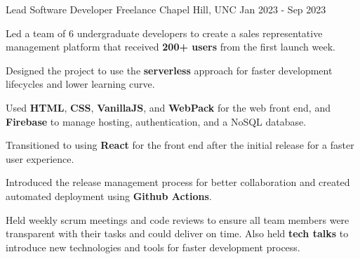 
\begin{cventries}
  \cventry
    {Lead Software Developer} %
    {Freelance} %
    {Chapel Hill, UNC} %
    {Jan 2023 - Sep 2023} %
    {
      \begin{cvitems} %
        \item {Led a team of 6 undergraduate developers to create a sales representative management platform that received \textbf{200+ users} from the first launch week.}
        \item {Designed the project to use the \textbf{serverless} approach for faster development lifecycles and lower learning curve.}
        \item {Used \textbf{HTML}, \textbf{CSS}, \textbf{VanillaJS}, and \textbf{WebPack} for the web front end, and \textbf{Firebase} to manage hosting, authentication, and a NoSQL database.}
        \item {Transitioned to using \textbf{React} for the front end after the initial release for a faster user experience.}
        \item {Introduced the release management process for better collaboration and created automated deployment using \textbf{Github Actions}.}
        \item {Held weekly scrum meetings and code reviews to ensure all team members were transparent with their tasks and could deliver on time. Also held \textbf{tech talks} to introduce new technologies and tools for faster development process.}
      \end{cvitems}
    }


\end{cventries}
